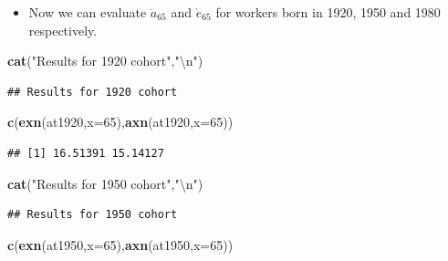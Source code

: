 \documentclass[ignorenonframetext,]{beamer}
\newenvironment{Shaded}{\begin{snugshade}}{\end{snugshade}}
\newcommand{\KeywordTok}[1]{\textcolor[rgb]{0.13,0.29,0.53}{\textbf{{#1}}}}
\newcommand{\DataTypeTok}[1]{\textcolor[rgb]{0.13,0.29,0.53}{{#1}}}
\newcommand{\DecValTok}[1]{\textcolor[rgb]{0.00,0.00,0.81}{{#1}}}
\newcommand{\CharTok}[1]{\textcolor[rgb]{0.31,0.60,0.02}{{#1}}}
\newcommand{\StringTok}[1]{\textcolor[rgb]{0.31,0.60,0.02}{{#1}}}
\newcommand{\NormalTok}[1]{{#1}}
\begin{document}
\begin{frame}[fragile]

\begin{itemize}[<+->]
\itemsep1pt\parskip0pt
\item
  Now we can evaluate $\ddot{a}_{65}$ and $\mathring{e}_{65}$ for
  workers born in 1920, 1950 and 1980 respectively.
\end{itemize}

\begin{Shaded}
\begin{Highlighting}[]
\KeywordTok{cat}\NormalTok{(}\StringTok{"Results for 1920 cohort"}\NormalTok{,}\StringTok{"}\CharTok{\textbackslash{}n}\StringTok{"}\NormalTok{)}
\end{Highlighting}
\end{Shaded}

\begin{verbatim}
## Results for 1920 cohort
\end{verbatim}

\begin{Shaded}
\begin{Highlighting}[]
\KeywordTok{c}\NormalTok{(}\KeywordTok{exn}\NormalTok{(at1920,}\DataTypeTok{x=}\DecValTok{65}\NormalTok{),}\KeywordTok{axn}\NormalTok{(at1920,}\DataTypeTok{x=}\DecValTok{65}\NormalTok{))}
\end{Highlighting}
\end{Shaded}

\begin{verbatim}
## [1] 16.51391 15.14127
\end{verbatim}

\begin{Shaded}
\begin{Highlighting}[]
\KeywordTok{cat}\NormalTok{(}\StringTok{"Results for 1950 cohort"}\NormalTok{,}\StringTok{"}\CharTok{\textbackslash{}n}\StringTok{"}\NormalTok{)}
\end{Highlighting}
\end{Shaded}

\begin{verbatim}
## Results for 1950 cohort
\end{verbatim}

\begin{Shaded}
\begin{Highlighting}[]
\KeywordTok{c}\NormalTok{(}\KeywordTok{exn}\NormalTok{(at1950,}\DataTypeTok{x=}\DecValTok{65}\NormalTok{),}\KeywordTok{axn}\NormalTok{(at1950,}\DataTypeTok{x=}\DecValTok{65}\NormalTok{))}
\end{Highlighting}
\end{Shaded}


\end{frame}
\end{document}
